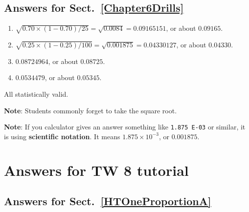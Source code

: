 \documentclass[
  11pt,
  a4paper,
  krantz2]{krantz}
\providecommand{\tightlist}{%
  \setlength{\itemsep}{0pt}\setlength{\parskip}{0pt}}
\begin{document}
\begin{footnotesize}
\subsection*{Answers for Sect.~\ref{Chapter6Drills}}\label{answers-for-sect.-refchapter6drills}

\begin{enumerate}
\def\labelenumi{\arabic{enumi}.}
\tightlist
\item
  \(\sqrt{0.70\times(1 - 0.70)/25} = \sqrt{0.0084} = 0.09165151\), or about \(0.09165\).
\item
  \(\sqrt{0.25\times(1 - 0.25)/100} = \sqrt{0.001875} = 0.04330127\), or about \(0.04330\).
\item
  \(0.08724964\), or about \(0.08725\).
\item
  \(0.0534479\), or about \(0.05345\).
\end{enumerate}

All statistically valid.

\textbf{Note}: Students commonly forget to take the square root.

\textbf{Note}: If you calculator gives an answer something like \texttt{1.875\ E-03} or similar, it is using \textbf{scientific notation}.
It means \(1.875\times 10^{-3}\), or \(0.001875\).

\section{Answers for TW 8 tutorial}\label{Lecture8Answers}

\subsection*{Answers for Sect.~\ref{HTOneProportionA}}\label{answers-for-sect.-refhtoneproportiona}


\end{footnotesize}
\end{document}
